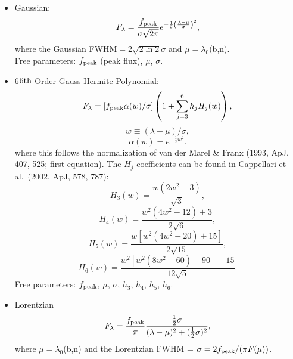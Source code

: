 \documentclass[12pt,letterpaper]{article}
\begin{document}
  \begin{itemize}
    \item Gaussian:
      \begin{equation} F_{\lambda} = \frac{f_{\rm peak}}{\sigma \sqrt{2\pi}}e^{-\frac{1}{2}\left(\frac{\lambda - \mu}{\sigma}\right)^2},
        \end{equation}
        where the Gaussian FWHM$=2\sqrt{2\ln 2}\sigma$ and $\mu=\lambda_0$(b,n).  \\ Free parameters: $f_{\rm peak}$ (peak flux), $\mu$, $\sigma$.
     \item 6$6{\rm th}$ Order Gauss-Hermite Polynomial:
       \begin{equation} F_{\lambda} = [f_{\rm peak} \alpha(w)/\sigma]\left(1 + \sum_{j=3}^{6}h_jH_j(w) \right), 
       \end{equation} 
       \begin{equation} w\equiv (\lambda - \mu)/\sigma,
       \end{equation}
       \begin{equation} \alpha(w) = e^{-\frac{1}{2}w^2}. \end{equation}
       where this follows the normalization of van der Marel \& Franx (1993, ApJ, 407, 525; first equation).  The $H_j$ coefficients can be found in Cappellari et al.\ (2002, ApJ, 578, 787):
       \begin{equation} H_3(w) = \frac{w(2w^2-3)}{\sqrt{3}}, \end{equation}
       \begin{equation} H_4(w) = \frac{w^2(4w^2-12)+3}{2\sqrt{6}}, \end{equation}
       \begin{equation} H_5(w) = \frac{w[w^2(4w^2-20)+15]}{2\sqrt{15}}, \end{equation}
       \begin{equation} H_6(w) = \frac{w^2[w^2(8w^2-60)+90]-15}{12\sqrt{5}}. \end{equation}
       Free parameters: $f_{\rm peak}$, $\mu$, $\sigma$, $h_3$, $h_4$, $h_5$, $h_6$.

     \item Lorentzian
       \begin{equation} F_{\lambda} = \frac{f_{\rm peak}}{\pi} \frac{\frac{1}{2}\sigma}{(\lambda - \mu)^2+(\frac{1}{2}\sigma)^2},
       \end{equation}
       where $\mu=\lambda_0$(b,n) and the Lorentzian FWHM = $\sigma = 2f_{\rm peak}/(\pi F(\mu))$.
  \end{itemize}
\end{document}
